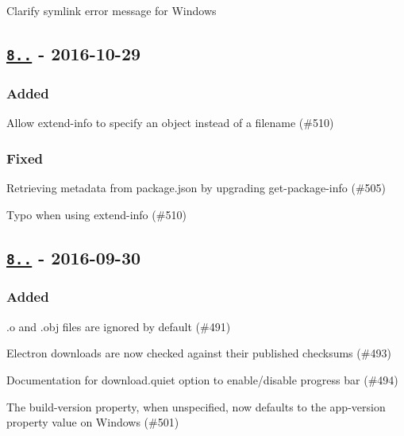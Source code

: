 \begin{DoxyItemize}
\item Clarify symlink error message for Windows
\end{DoxyItemize}

\subsection*{\href{https://github.com/electron-userland/electron-packager/compare/v8.1.0...v8.2.0}{\tt 8..} -\/ 2016-\/10-\/29}

\subsubsection*{Added}


\begin{DoxyItemize}
\item Allow {\ttfamily extend-\/info} to specify an object instead of a filename (\#510)
\end{DoxyItemize}

\subsubsection*{Fixed}


\begin{DoxyItemize}
\item Retrieving metadata from {\ttfamily package.\+json} by upgrading {\ttfamily get-\/package-\/info} (\#505)
\item Typo when using {\ttfamily extend-\/info} (\#510)
\end{DoxyItemize}

\subsection*{\href{https://github.com/electron-userland/electron-packager/compare/v8.0.0...v8.1.0}{\tt 8..} -\/ 2016-\/09-\/30}

\subsubsection*{Added}


\begin{DoxyItemize}
\item {\ttfamily .o} and {\ttfamily .obj} files are ignored by default (\#491)
\item Electron downloads are now checked against their published checksums (\#493)
\item Documentation for {\ttfamily download.\+quiet} option to enable/disable progress bar (\#494)
\item The {\ttfamily build-\/version} property, when unspecified, now defaults to the {\ttfamily app-\/version} property value on Windows (\#501)
\end{DoxyItemize}

